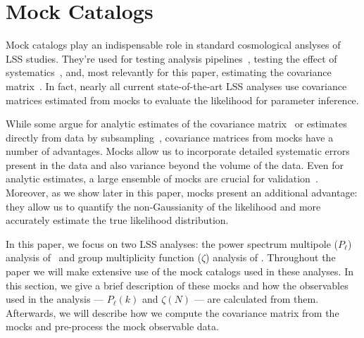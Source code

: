 \documentclass[12pt, letterpaper, preprint]{aastex}
\newcommand{\Beut}{\citetalias{beutler2017}}
\newcommand{\Sinh}{\citetalias{sinha2017}}
\begin{document}
\section{Mock Catalogs} \label{sec:mocks}
Mock catalogs play an indispensable role in standard cosmological 
anslyses of LSS studies. They're used for testing analysis 
pipelines~\citep[][]{beutler2017, grieb2017, tinkerinpreparation}, 
testing the effect of systematics~\citep{guo2012, vargas-magana2014, hahn2017c, pinol2017, ross2017}, 
and, most relevantly for this paper, estimating the covariance 
matrix~\citep[][]{parkinson2012, kazin2014, grieb2017, alam2017, beutler2017, sinha2017}. 
In fact, nearly all current state-of-the-art LSS analyses use
covariance matrices estimated from mocks to evaluate the likelihood 
for parameter inference. 

While some argue for analytic estimates of the covariance 
matrix~\citep[e.g.][]{mohammed2017} or estimates directly from data
by subsampling~\citep[e.g.][]{norberg2009}, covariance matrices 
from mocks have a number of advantages. Mocks allow us 
to incorporate detailed systematic errors present in the 
data and also variance beyond the volume of the data. Even for analytic 
estimates, a large ensemble of mocks are crucial for validation~\citep[\emph{e.g.}][]{slepian2017}. 
Moreover, as we show later in this paper, mocks present an
additional advantage: they allow us to 
quantify the non-Gaussianity of the likelihood and more accurately 
estimate the true likelihood distribution. 

In this paper, we focus on two LSS analyses: the power spectrum 
multipole ($P_\ell$) analysis of \Beut~and group multiplicity 
function ($\zeta$) analysis of \Sinh. Throughout the paper we will 
make extensive use of the mock catalogs used in these analyses. 
In this section, we give a brief description of these mocks and how 
the observables used in the analysis --- $P_\ell(k)$ and $\zeta(N)$ ---
are calculated from them. Afterwards, we will describe how we compute 
the covariance matrix from the mocks and pre-process the mock observable
data.
\end{document}
